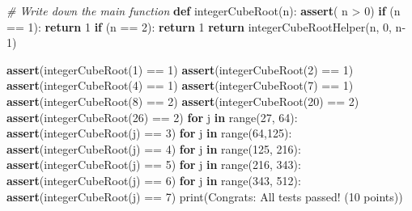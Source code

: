 \documentclass[
]{article}
\newenvironment{Shaded}{}{}
\newcommand{\BuiltInTok}[1]{\textcolor[rgb]{0.00,0.50,0.00}{#1}}
\newcommand{\CommentTok}[1]{\textcolor[rgb]{0.38,0.63,0.69}{\textit{#1}}}
\newcommand{\ControlFlowTok}[1]{\textcolor[rgb]{0.00,0.44,0.13}{\textbf{#1}}}
\newcommand{\DecValTok}[1]{\textcolor[rgb]{0.25,0.63,0.44}{#1}}
\newcommand{\KeywordTok}[1]{\textcolor[rgb]{0.00,0.44,0.13}{\textbf{#1}}}
\newcommand{\NormalTok}[1]{#1}
\newcommand{\OperatorTok}[1]{\textcolor[rgb]{0.40,0.40,0.40}{#1}}
\newcommand{\StringTok}[1]{\textcolor[rgb]{0.25,0.44,0.63}{#1}}
\begin{document}
\begin{Shaded}
\begin{Highlighting}[]
\CommentTok{\# Write down the main function}
\KeywordTok{def}\NormalTok{ integerCubeRoot(n):}
    \ControlFlowTok{assert}\NormalTok{( n }\OperatorTok{\textgreater{}} \DecValTok{0}\NormalTok{)}
    \ControlFlowTok{if}\NormalTok{ (n }\OperatorTok{==} \DecValTok{1}\NormalTok{): }
        \ControlFlowTok{return} \DecValTok{1}
    \ControlFlowTok{if}\NormalTok{ (n }\OperatorTok{==} \DecValTok{2}\NormalTok{):}
        \ControlFlowTok{return} \DecValTok{1}
    \ControlFlowTok{return}\NormalTok{ integerCubeRootHelper(n, }\DecValTok{0}\NormalTok{, n}\OperatorTok{{-}}\DecValTok{1}\NormalTok{)}
\end{Highlighting}
\end{Shaded}

\begin{Shaded}
\begin{Highlighting}[]
\ControlFlowTok{assert}\NormalTok{(integerCubeRoot(}\DecValTok{1}\NormalTok{) }\OperatorTok{==} \DecValTok{1}\NormalTok{)}
\ControlFlowTok{assert}\NormalTok{(integerCubeRoot(}\DecValTok{2}\NormalTok{) }\OperatorTok{==} \DecValTok{1}\NormalTok{)}
\ControlFlowTok{assert}\NormalTok{(integerCubeRoot(}\DecValTok{4}\NormalTok{) }\OperatorTok{==} \DecValTok{1}\NormalTok{)}
\ControlFlowTok{assert}\NormalTok{(integerCubeRoot(}\DecValTok{7}\NormalTok{) }\OperatorTok{==} \DecValTok{1}\NormalTok{)}
\ControlFlowTok{assert}\NormalTok{(integerCubeRoot(}\DecValTok{8}\NormalTok{) }\OperatorTok{==} \DecValTok{2}\NormalTok{)}
\ControlFlowTok{assert}\NormalTok{(integerCubeRoot(}\DecValTok{20}\NormalTok{) }\OperatorTok{==} \DecValTok{2}\NormalTok{)}
\ControlFlowTok{assert}\NormalTok{(integerCubeRoot(}\DecValTok{26}\NormalTok{) }\OperatorTok{==} \DecValTok{2}\NormalTok{)}
\ControlFlowTok{for}\NormalTok{ j }\KeywordTok{in} \BuiltInTok{range}\NormalTok{(}\DecValTok{27}\NormalTok{, }\DecValTok{64}\NormalTok{):}
    \ControlFlowTok{assert}\NormalTok{(integerCubeRoot(j) }\OperatorTok{==} \DecValTok{3}\NormalTok{)}
\ControlFlowTok{for}\NormalTok{ j }\KeywordTok{in} \BuiltInTok{range}\NormalTok{(}\DecValTok{64}\NormalTok{,}\DecValTok{125}\NormalTok{):}
    \ControlFlowTok{assert}\NormalTok{(integerCubeRoot(j) }\OperatorTok{==} \DecValTok{4}\NormalTok{)}
\ControlFlowTok{for}\NormalTok{ j }\KeywordTok{in} \BuiltInTok{range}\NormalTok{(}\DecValTok{125}\NormalTok{, }\DecValTok{216}\NormalTok{):}
    \ControlFlowTok{assert}\NormalTok{(integerCubeRoot(j) }\OperatorTok{==} \DecValTok{5}\NormalTok{)}
\ControlFlowTok{for}\NormalTok{ j }\KeywordTok{in} \BuiltInTok{range}\NormalTok{(}\DecValTok{216}\NormalTok{, }\DecValTok{343}\NormalTok{):}
    \ControlFlowTok{assert}\NormalTok{(integerCubeRoot(j) }\OperatorTok{==} \DecValTok{6}\NormalTok{)}
\ControlFlowTok{for}\NormalTok{ j }\KeywordTok{in} \BuiltInTok{range}\NormalTok{(}\DecValTok{343}\NormalTok{, }\DecValTok{512}\NormalTok{):}
    \ControlFlowTok{assert}\NormalTok{(integerCubeRoot(j) }\OperatorTok{==} \DecValTok{7}\NormalTok{)}
\BuiltInTok{print}\NormalTok{(}\StringTok{\textquotesingle{}Congrats: All tests passed! (10 points)\textquotesingle{}}\NormalTok{)}
\end{Highlighting}
\end{Shaded}
\end{document}
